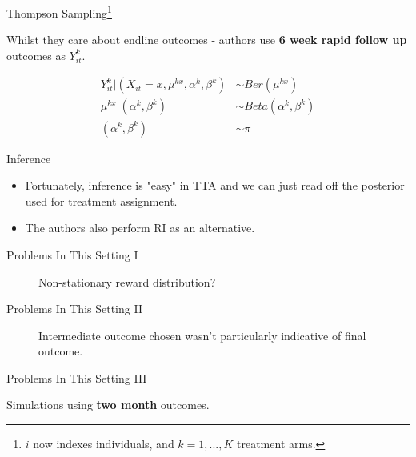 \documentclass[aspectratio=169,xcolor=dvipsnames]{beamer}
\begin{document}
\begin{frame}{Thompson Sampling\footnote{$i$ now indexes individuals, and $k = 1, ..., K$ treatment arms.}}

    Whilst they care about endline outcomes - authors use \textbf{6 week rapid follow up} outcomes as
    $Y_{it}^k$.

    \begin{align*}
       Y_{it}^k | (X_{it} = x, \mu^{kx}, \alpha^k, \beta^k) &\sim Ber(\mu^{kx}) \\
       \mu^{kx} | (\alpha^k, \beta^k) &\sim Beta(\alpha^k, \beta^k) \\
       (\alpha^k, \beta^k) &\sim \pi
    \end{align*}

\end{frame}




\begin{frame}{Inference}

    \begin{itemize}
        \item Fortunately, inference is "easy" in TTA and we can just read off the posterior 
    used for treatment assignment.
        \item The authors also perform RI as an alternative.
    \end{itemize}

\end{frame}


\begin{frame}{Problems In This Setting I}


    \begin{figure}[htbp]
        \centering
        \caption{Non-stationary reward distribution?}
    \end{figure}
\end{frame}

\begin{frame}{Problems In This Setting II}

    \begin{figure}[htbp]
        \centering
       \caption{Intermediate outcome chosen wasn't particularly indicative of 
       final outcome.}
    \end{figure}
    

\end{frame}

\begin{frame}{Problems In This Setting III}

   \begin{figure}[htbp]
       \centering
   \end{figure} 

       Simulations using \textbf{two month} outcomes.
\end{frame}
\end{document}
